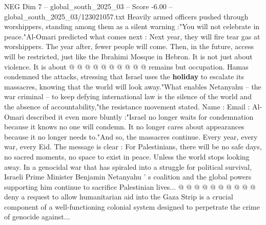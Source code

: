 \begin{textsample}{NEG Dim 7 – global\_south\_2025\_03 – Score -6.00 – global\_south\_2025\_03/123021057.txt}
Heavily armed officers pushed through worshippers, standing among them as a silent warning :"You will not celebrate in peace."Al-Omari predicted what comes next : Next year, they will fire tear gas at worshippers.
The year after, fewer people will come.
Then, in the future, access will be restricted, just like the Ibrahimi Mosque in Hebron.
It is not just about violence.
It is about @ @ @ @ @ @ @ @ @ @ remains but occupation.
Hamas condemned the attacks, stressing that Israel uses the \textbf{holiday} to escalate its massacres, knowing that the world will look away."What enables Netanyahu -- the war criminal -- to keep defying international law is the silence of the world and the absence of accountability,"the resistance movement stated.
Name : Email : Al-Omari described it even more bluntly :"Israel no longer waits for condemnation because it knows no one will condemn.
It no longer cares about appearances because it no longer needs to."And so, the massacres continue.
Every year, every war, every Eid.
The message is clear : For Palestinians, there will be no safe days, no sacred moments, no space to exist in peace.
Unless the world stops looking away.
In a genocidal war that has spiraled into a struggle for political survival, Israeli Prime Minister Benjamin Netanyahu ' s coalition and the global powers supporting him continue to sacrifice Palestinian lives... @ @ @ @ @ @ @ @ @ @ deny a request to allow humanitarian aid into the Gaza Strip is a crucial component of a well-functioning colonial system designed to perpetrate the crime of genocide against...

\end{textsample}
